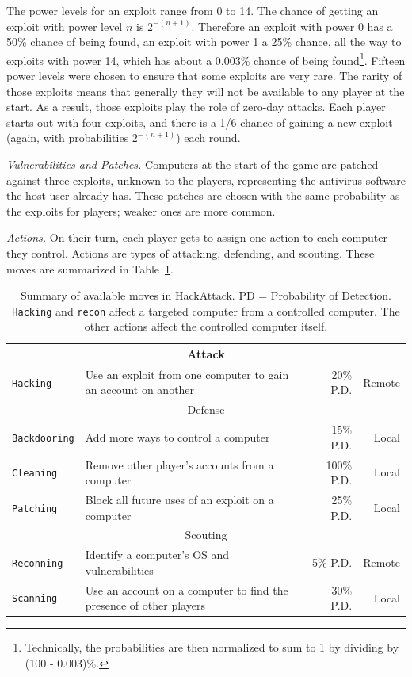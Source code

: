 \documentclass{sig-alternate}
\newcommand{\highlightrow}{}  %
\begin{document}
The power levels for an exploit range from 0 to 14. 
The chance of getting an exploit with power level $n$ is $2^{-(n+1)}$. 
Therefore an exploit with power 0 has a 50\% chance of being found, an exploit with power 1 a 25\% chance, all the way to exploits with power 14, which has about a 0.003\% chance of being found\footnote{Technically, the probabilities are then normalized to sum to 1 by dividing by (100 - 0.003)\%.}. 
Fifteen power levels were chosen to ensure that some exploits are very rare.
The rarity of those exploits means that generally they will not be available to any player at the start.
As a result, those exploits play the role of zero-day attacks.
Each player starts out with four exploits, and there is a 1/6 chance of gaining a new exploit (again, with probabilities $2^{-(n+1)}$) each round. 

{\em Vulnerabilities and Patches.}
Computers at the start of the game are patched against three exploits, unknown to the players, representing the antivirus software the host user already has. These patches are chosen with the same probability as the exploits for players; weaker ones are more common. 


{\em Actions.}
On their turn, each player gets to assign one action to each computer they control.
Actions are types of attacking, defending, and scouting. These moves are summarized in Table~\ref{tab:moves}.
	
\begin{table}
\begin{center}
\begin{tabular}{|l|l|r|r|}
\hline 
\highlightrow \multicolumn{4}{|c|}{Attack} \\
\hline 
{\tt Hacking} & Use an exploit from one computer to gain an account on another &  20\% P.D. & Remote \\
\hline 
\highlightrow \multicolumn{4}{|c|}{Defense} \\
\hline 
{\tt Backdooring} & Add more ways to control a computer & 15\% P.D.  & Local \\
{\tt Cleaning} & Remove other player's accounts from a computer & 100\% P.D. & Local \\
{\tt Patching} & Block all future uses of an exploit on a computer & 25\% P.D.  & Local \\
\hline 
\highlightrow \multicolumn{4}{|c|}{Scouting} \\
\hline 
{\tt Reconning} & Identify a computer's OS and vulnerabilities & 5\% P.D. & Remote \\
{\tt Scanning} & Use an account on a computer to find the presence of other players & 30\% P.D. 
& Local \\
\hline
\end{tabular}
\caption{Summary of available moves in HackAttack. PD = Probability of Detection. {\tt Hacking} and {\tt recon} affect a targeted computer from a controlled computer. The other actions affect the controlled computer itself.\label{tab:moves}}
\end{center}
\end{table}
\end{document}
